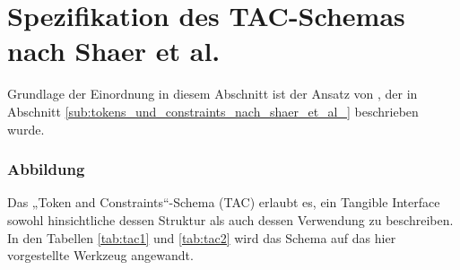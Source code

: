 
\section{Spezifikation des TAC-Schemas nach Shaer et al.} %
\label{sec:spezifikation_des_tac_schemas_nach_shaer_et_al_}

Grundlage der Einordnung in diesem Abschnitt ist der Ansatz von \citet{Shaer04}, der in Abschnitt \ref{sub:tokens_und_constraints_nach_shaer_et_al_} beschrieben wurde.

\subsubsection{Abbildung}

Das „Token and Constraints“-Schema (\gls{TAC}) erlaubt es, ein Tangible Interface sowohl hinsichtliche dessen Struktur als auch dessen Verwendung zu beschreiben. In den Tabellen \ref{tab:tac1} und \ref{tab:tac2} wird das Schema auf das hier vorgestellte Werkzeug angewandt. 

